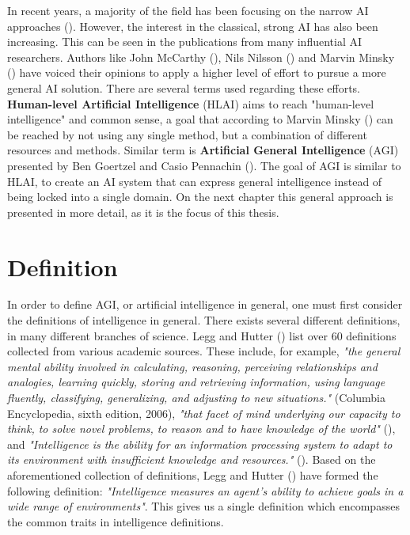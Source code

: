 In recent years, a majority of the field has been focusing on the narrow AI
approaches (\cite{goertzel2007}). However, the interest in the classical, strong
AI has also been increasing. This can be seen in the publications from many
influential AI researchers. Authors like John McCarthy (\cite*{mccarthy2007}),
Nils Nilsson (\cite*{nilsson2005}) and Marvin Minsky (\cite*{minsky2007}) have
voiced their opinions to apply a higher level of effort to pursue a more general
AI solution. There are several terms used regarding these efforts.
\textbf{Human-level Artificial Intelligence} (HLAI) aims to reach "human-level
intelligence" and common sense, a goal that according to Marvin Minsky
(\cite*{minsky2004}) can be reached by not using any single method, but a
combination of different resources and methods. Similar term is
\textbf{Artificial General Intelligence} (AGI) presented by Ben Goertzel and
Casio Pennachin (\cite*{goertzel2007}). The goal of AGI is similar to HLAI, to
create an AI system that can express general intelligence instead of being
locked into a single domain. On the next chapter this general approach is
presented in more detail, as it is the focus of this thesis.


\section{Definition}
\label{definition}

In order to define AGI, or artificial intelligence in general, one must first
consider the definitions of intelligence in general. There exists several
different definitions, in many different branches of science. Legg and Hutter
(\cite*{legg2007}) list over 60 definitions collected from various academic
sources. These include, for example, \emph{"the general mental ability involved
in calculating, reasoning, perceiving relationships and analogies, learning
quickly, storing and retrieving information, using language fluently,
classifying, generalizing, and adjusting to new situations."} (Columbia
Encyclopedia, sixth edition, 2006), \emph{"that facet of mind underlying our
capacity to think, to solve novel problems, to reason and to have knowledge of
the world"} (\cite{anderson2006}), and \emph{"Intelligence is the ability for an
information processing system to adapt to its environment with insufficient
knowledge and resources."} (\cite{wang1995}). Based on the aforementioned
collection of definitions, Legg and Hutter (\cite*{legg2007}) have formed the
following definition: \emph{"Intelligence measures an agent's ability to achieve
goals in a wide range of environments"}. This gives us a single definition which
encompasses the common traits in intelligence definitions.

